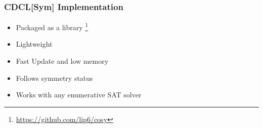 \documentclass{beamer}
\begin{document}
\begin{frame}
\frametitle{CDCL[Sym] Implementation}
\begin{itemize}
	\item Packaged as a library \textbf{\libdsb}\footnote{\url{https://github.com/lip6/cosy}}

	\item Lightweight
	\item Fast Update and low memory
	\item Follows symmetry status

	\vfill

	\item  Works with any enumerative SAT solver

\end{itemize}

\end{frame}
\end{document}

